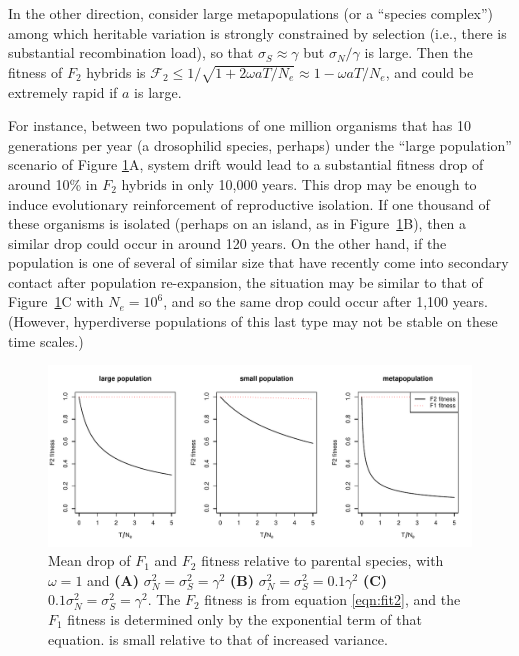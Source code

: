 \documentclass{article}
\newcommand{\1}{\mathbbm{1}}
\newcommand{\fit}{\mathcal{F}}
\begin{document}
In the other direction, consider large metapopulations (or a ``species complex'')
among which heritable variation is strongly constrained by selection
(i.e., there is substantial recombination load),
so that $\sigma_S \approx \gamma$ but $\sigma_N/\gamma$ is large.
Then the fitness of $F_2$ hybrids is $\fit_2 \le 1/\sqrt{1 + 2 \omega a T/N_e} \approx 1 - \omega a T/N_e$,
and could be extremely rapid if $a$ is large.

For instance, between two populations of one million organisms that has 10 generations per year (a drosophilid species, perhaps)
under the ``large population'' scenario of Figure \ref{fig:speciation_rates}A,
system drift would lead to a substantial fitness drop of around 10\% in $F_2$ hybrids in only 10,000 years.
This drop may be enough to induce evolutionary reinforcement of reproductive isolation.
If one thousand of these organisms is isolated (perhaps on an island, as in Figure~\ref{fig:speciation_rates}B),
then a similar drop could occur in around 120 years.
On the other hand, if the population is one of several of similar size
that have recently come into secondary contact after population re-expansion,
the situation may be similar to that of Figure~\ref{fig:speciation_rates}C with $N_e = 10^6$,
and so the same drop could occur after 1,100 years.
(However, hyperdiverse populations of this last type may not be stable on these time scales.)


\begin{figure}[H]
\begin{center}
\includegraphics{speciation_rates}
\caption{
Mean drop of $F_1$ and $F_2$ fitness relative to parental species,
with $\omega=1$ and 
\textbf{(A)} $\sigma_N^2 = \sigma_S^2 = \gamma^2$
\textbf{(B)} $\sigma_N^2 = \sigma_S^2 = 0.1 \gamma^2$
\textbf{(C)} $0.1 \sigma_N^2 = \sigma_S^2 = \gamma^2$.
The $F_2$ fitness is from equation \eqref{eqn:fit2},
and the $F_1$ fitness is determined only by the exponential term of that equation.
is small relative to that of increased variance.
\label{fig:speciation_rates}}
\end{center}
\end{figure}
\end{document}
